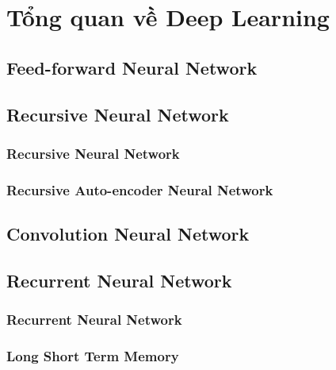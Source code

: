 \chapter{Tổng quan về Deep Learning}
\label{Chapter3}

\section{Feed-forward Neural Network}

\section{Recursive Neural Network}
\subsection{Recursive Neural Network}

\subsection{Recursive Auto-encoder Neural Network}


\section{Convolution Neural Network}


\section{Recurrent Neural Network}
\subsection{Recurrent Neural Network}
\subsection{Long Short Term Memory}

